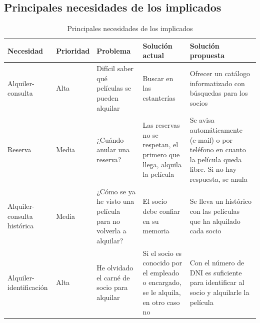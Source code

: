 \subsection*{Principales necesidades de los implicados}

\begin{table}[H]
\centering
\begin{tabular}{|p{5cm}|p{4cm}|p{4cm}|p{4cm}|p{4cm}|}
\hline
\rowcolor[HTML]{CFE2F3} 
\textbf{Necesidad} & \textbf{Prioridad} & \textbf{Problema} & \textbf{Solución actual} & \textbf{Solución propuesta} \\ \hline
Alquiler-consulta & Alta & Difícil saber qué películas se pueden alquilar & Buscar en las estanterías & Ofrecer un catálogo informatizado con búsquedas para los socios \\ \hline
Reserva & Media & ¿Cuándo anular una reserva? & Las reservas no se respetan, el primero que llega, alquila la película & Se avisa automáticamente (e-mail) o por teléfono en cuanto la película queda libre. Si no hay respuesta, se anula \\ \hline
Alquiler-consulta histórica & Media & ¿Cómo se ya he visto una película para no volverla a alquilar? & El socio debe confiar en su memoria & Se lleva un histórico con las películas que ha alquilado cada socio \\ \hline
Alquiler-identificación & Alta & He olvidado el carné de socio para alquilar & Si el socio es conocido por el empleado o encargado, se le alquila, en otro caso no & Con el número de DNI es suficiente para identificar al socio y alquilarle la película \\ \hline
\end{tabular}
\caption{Principales necesidades de los implicados}
\label{tab:necesidades_implicados}
\end{table}